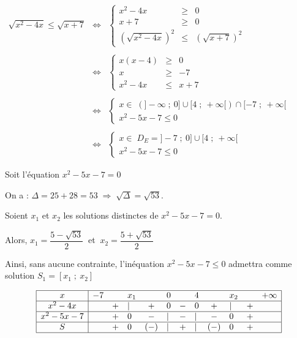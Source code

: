 \documentclass[12pt,a4paper]{article}
\newcounter{solution}
\begin{document}
$\begin{array}{rcl} \sqrt{x^{2}-4x}\leq\sqrt{x+7} & \Leftrightarrow & \left\lbrace\begin{array}{rcl} x^{2}-4x&\geq&0 \\ x+7&\geq&0 \\ (\sqrt{x^{2}-4x})^{2}&\leq&(\sqrt{x+7})^{2} \end{array}\right. \\ \\ & \Leftrightarrow & \left\lbrace\begin{array}{rcl} x(x-4)&\geq&0 \\ x&\geq&-7 \\ x^{2}-4x&\leq&x+7 \end{array}\right. \\ \\ & \Leftrightarrow & \left\lbrace\begin{array}{lll} x\in\;(]-\infty\;;\ 0]\cup[4\;;\ +\infty[)\cap[-7\;;\ +\infty[ \\ x^{2}-5x-7\leq 0 \end{array}\right. \\ \\  & \Leftrightarrow & \left\lbrace\begin{array}{lll} x\in\;D_{E}=]-7\;;\ 0]\cup[4\;;\ +\infty[ \\ x^{2}-5x-7\leq 0 \end{array}\right. \end{array}$

Soit l'équation $x^{2}-5x-7=0$

On a : $\Delta=25+28=53\;\Rightarrow\;\sqrt{\Delta}=\sqrt{53}.$

Soient $x_{1}$ et $x_{2}$ les solutions distinctes de $x^{2}-5x-7=0$.

Alors, $x_{1}=\dfrac{5-\sqrt{53}}{2}\ $ et $\ x_{2}=\dfrac{5+\sqrt{53}}{2}$

Ainsi, sans aucune contrainte, l'inéquation $x^{2}-5x-7\leq 0$ admettra comme solution $S_{1}=[x_{1}\;;\ x_{2}]$

$$\begin{array}{|c|lclclclclcr|} \hline x & -7 & & x_{1} &  & 0 &  & 4 & & x_{2} & & +\infty \\ \hline x^{2}-4x & & + & | & + & 0 & - & 0 & + &|& + & \\ \hline x^{2}-5x-7 &  & + & 0 & - & | & - & | & - & 0 & + & \\ \hline S &  & + & 0 & (-) & | & + & |& (-) & 0 & + & \\ \hline \end{array}$$
\end{document}
